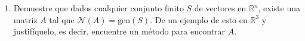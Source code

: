 \documentclass[11pt,letterpaper]{article}
\newcommand{\mR}{\mathbb{R}}
\newcommand{\mcN}{\mathcal{N}}
\newcommand{\finf}{\blacksquare.}
\newcommand{\gen}{\text{gen}}
\begin{document}
\begin{enumerate}
\begin{align*}
\begin{array}{ccc}
 \frac{43}{11} &-\frac{10}{11}&\frac{40}{33}
\end{array}\right)
\begin{pmatrix}
\frac{12}{7}\\
-\frac{17}{14}\\
-\frac{33}{7}
\end{pmatrix}=\begin{pmatrix}
\frac{-12}{11(7)}+\frac{-12(17)}{11(14)}+\frac{4(33)}{33(7)}\\
\frac{-12(36)}{11(7)}+\frac{-14(17)}{11(14)}+\frac{-15(33)}{11(7)}\\
\frac{-12(43)}{11(7)}+\frac{-10(-17)}{11(14)}+\frac{-40(33)}{33(7)}\\
\end{pmatrix}=\begin{pmatrix}
-\frac{10}{11}\\
\frac{8}{11}\\
\frac{23}{11}
\end{pmatrix}.\ \ \ \finf
\end{align*}
\item Demuestre que dados cualquier conjunto finito $S$ de vectores en $\mR^n$, existe una matriz $A$ tal que $\mcN(A)=\gen (S)$. De un ejemplo de esto en $\mR^3$ y justifíquelo, es decir, encuentre un método para encontrar $A$.


\end{enumerate}
\end{document}
